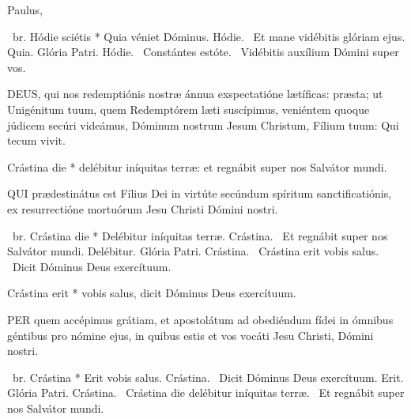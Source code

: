 

 Paulus, 

\V\ br. Hódie sciétis * Quia véniet Dóminus. Hódie. \V\ Et mane vidébitis glóriam ejus. Quia. Glória Patri. Hódie. \V\ Constántes estóte. \R\ Vidébitis auxílium Dómini super vos.


\lettrine[lines=2]{D}{EUS}, qui nos redemptiónis nostræ ánnua exspectatióne lætíficas: præsta; ut Unigénitum tuum, quem Redemptórem læti suscípimus, veniéntem quoque júdicem secúri videámus, Dóminum nostrum Jesum Christum, Fílium tuum: Qui tecum vivit.


 Crástina die * delébitur iníquitas terræ: et regnábit super nos Salvátor mundi.


\lettrine[lines=2]{Q}{UI} prædestinátus est Fílius Dei in virtúte secúndum spíritum sanctificatiónis, ex resurrectióne mortuórum Jesu Christi Dómini nostri.

\R\ br. Crástina die * Delébitur iníquitas terræ. Crástina. \V\ Et regnábit super nos Salvátor mundi. Delébitur. Glória Patri. Crástina. \V\ Crástina erit vobis salus. \R\ Dicit Dóminus Deus exercítuum.


 Crástina erit * vobis salus, dicit Dóminus Deus exercítuum.


\lettrine[lines=2]{P}{ER} quem accépimus grátiam, et apostolátum ad obediéndum fídei in ómnibus géntibus pro nómine ejus, in quibus estis et vos vocáti Jesu Christi, Dómini nostri.

\R\ br. Crástina * Erit vobis salus. Crástina. \V\ Dicit Dóminus Deus exercítuum. Erit. Glória Patri. Crástina. \V\ Crástina die delébitur iníquitas terræ. \R\ Et regnábit super nos Salvátor mundi.


\sectionornament


